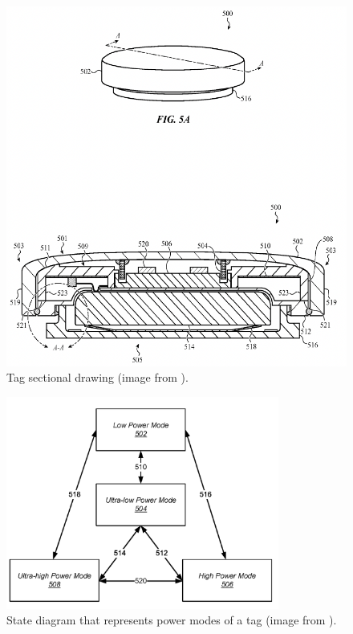 \documentclass[english]{article}
\begin{document}
\begin{figure}[]
	\centering
	\includegraphics[width=\textwidth]{images/br1 s2.png}
	\caption{Tag sectional drawing (image from \cite{Perkins_Sano_Walton_Wang_Werner_Ashcroft_De_Hunter_Kim_Crosby_Jung_Schaevitz_Avendal_Da_Di_Nath_Papantonis_Graham_Thompson_Copeland_Ely_2022}). }
	\label{img:br2}
\end{figure}

\begin{figure}[]
	\centering
	\includegraphics[width=0.8\textwidth]{images/br3.png}
	\caption{State diagram that represents power modes of a tag (image from \cite{Foster_Nilsen_Puskarich_2020}). }
	\label{img:br3}
\end{figure}
\end{document}
